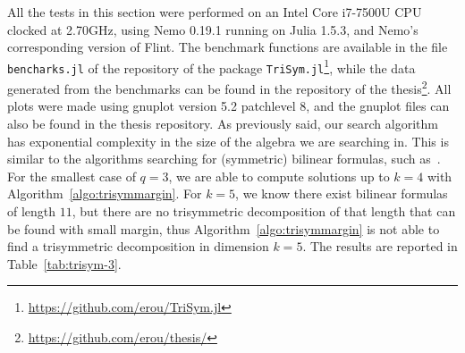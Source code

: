 All the tests in this section were performed on an Intel Core i7-7500U
CPU clocked at 2.70GHz, using Nemo 0.19.1 running on Julia 1.5.3, and Nemo’s
corresponding version of Flint. The benchmark functions are available in the
file \texttt{bencharks.jl} of the repository of the package
\texttt{TriSym.jl}\footnote{\url{https://github.com/erou/TriSym.jl}}, while the
data generated from the benchmarks can be found in the repository of the
thesis\footnote{\url{https://github.com/erou/thesis/}}. All plots were made
using gnuplot version 5.2 patchlevel 8, and the gnuplot files can also be found
in the thesis repository. As previously said, our search
algorithm has exponential complexity in the size of the algebra we are
searching in. This is similar to the algorithms searching for (symmetric)
bilinear formulas, such as~\cite{Covanov19, BDEZ12}. For the smallest case of
$q=3$, we are able to compute solutions up to $k=4$ with
Algorithm~\ref{algo:trisymmargin}. For $k=5$, we know there exist bilinear
formulas of length $11$, but there are no trisymmetric decomposition of that
length that can be found with small margin, thus
Algorithm~\ref{algo:trisymmargin} is not able to find a trisymmetric
decomposition in dimension $k=5$. The results are reported in
Table~\ref{tab:trisym-3}.
